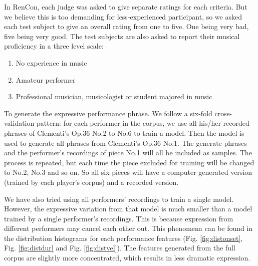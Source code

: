 In RenCon, each judge was asked to give separate ratings for each criteria. But we believe this is too demanding for less-experienced participant, so we asked each test subject to give an overall rating from one to five. One being very bad, five being very good. The test subjects are also asked to report their musical proficiency in a three level scale:
\begin{enumerate}
   \item No experience in music 
   \item Amateur performer
   \item Professional musician, musicologist or student majored in music
\end{enumerate}

To generate the expressive performance phrase. We follow a six-fold cross-validation pattern: for each performer in the corpus, we use all his/her recorded phrases of Clementi's Op.36 No.2 to No.6 to train a model. Then the model is used to generate all phrases from Clementi's Op.36 No.1. The generate phrases and the performer's recordings of piece No.1 will all be included as samples. The process is repeated, but each time the piece excluded for training will be changed to No.2, No.3 and so on. So all six pieces will have a computer generated version (trained by each player's corpus) and a recorded version.


We have also tried using all performers' recordings to train a single model. However, the expressive variation from that model is much smaller than a model trained by a single performer's recordings. This is because expression from different performers may cancel each other out. This phenomena can be found in the distribution histograms for each performance features (Fig. \ref{fig:distonset}, Fig. \ref{fig:distdur} and Fig. \ref{fig:distvel}). The features generated from the full corpus are slightly more concentrated, which results in less dramatic expression.


